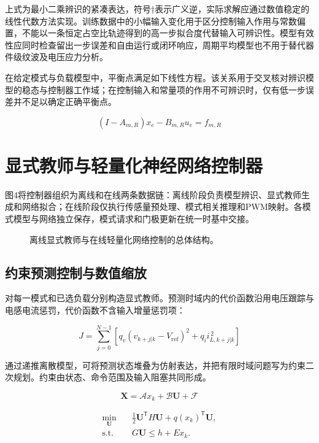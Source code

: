 \documentclass[UTF8,fontset=fandol,a4paper,twocolumn,10pt]{ctexart}
\begin{document}
上式为最小二乘辨识的紧凑表达，符号†表示广义逆，实际求解应通过数值稳定的线性代数方法实现。训练数据中的小幅输入变化用于区分控制输入作用与常数偏置，不能以一条恒定占空比轨迹得到的高一步拟合度代替输入可辨识性。模型有效性应同时检查留出一步误差和自由运行或闭环响应，周期平均模型也不用于替代器件级纹波及电压应力分析。

在给定模式与负载模型中，平衡点满足如下线性方程。该关系用于交叉核对辨识模型的稳态与控制器工作域；在控制输入和常量项的作用不可辨识时，仅有低一步误差并不足以确定正确平衡点。

\begin{equation}(I-A_{m,R})x_e-B_{m,R}u_e=f_{m,R}\label{eq:16}\end{equation}


\section{显式教师与轻量化神经网络控制器}

图4将控制器组织为离线和在线两条数据链：离线阶段负责模型辨识、显式教师生成和网络拟合；在线阶段仅执行传感量预处理、模式相关推理和PWM映射。各模式模型与网络独立保存，模式请求和门极更新在统一时基中交接。

\begin{figure}[!tp]\centering\resizebox{.98\textwidth}{!}{}
\caption{离线显式教师与在线轻量化网络控制的总体结构。}\label{fig:4}\end{figure}


\subsection{约束预测控制与数值缩放}

对每一模式和已选负载分别构造显式教师。预测时域内的代价函数沿用电压跟踪与电感电流惩罚，代价函数不含输入增量惩罚项：

\begin{equation}J=\sum_{j=0}^{N-1}\left[q_v(v_{k+j|k}-V_{\mathrm{ref}})^2+q_i i_{L,k+j|k}^{\,2}\right]\label{eq:17}\end{equation}

通过递推离散模型，可将预测状态堆叠为仿射表达，并把有限时域问题写为约束二次规划。约束由状态、命令范围及输入阻塞共同形成。

\begin{equation}\mathbf X=\mathcal A x_k+\mathcal B\mathbf U+\mathcal F\label{eq:18}\end{equation}

\begin{equation}\begin{aligned}\min_{\mathbf U}\quad&\tfrac12\mathbf U^{\mathsf T}H\mathbf U+q(x_k)^{\mathsf T}\mathbf U,\\ \mathrm{s.t.}\quad&G\mathbf U\le h+E x_k.\end{aligned}\label{eq:19}\end{equation}
\end{document}
